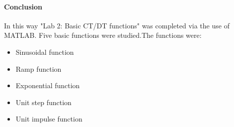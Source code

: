 \documentclass[12pt]{article}
\begin{document}
\paragraph{Conclusion\\}
In this way "Lab 2: Basic CT/DT functions" was completed via the use of MATLAB.
Five basic functions were studied.The functions were:
\begin{itemize}
    \item Sinusoidal function
    \item Ramp function
    \item Exponential function
    \item Unit step function
    \item Unit impulse function
\end{itemize}
\end{document}

